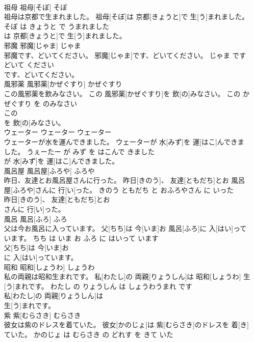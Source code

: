 \documentclass[8pt]{extreport}
\begin{document}
\begin{CJK}{UTF8}{min}
\\	祖母	祖母[そぼ]	そぼ	
\\	祖母は京都で生まれました。	祖母[そぼ]は 京都[きょうと]で 生[う]まれました。	そぼ は きょうと で うまれました	
\\	は 京都[きょうと]で 生[う]まれました。			
\\	邪魔	邪魔[じゃま]	じゃま	
\\	邪魔です、どいてください。	邪魔[じゃま]です、どいてください。	じゃま です どいて ください	
\\	です、どいてください。			
\\	風邪薬	風邪薬[かぜぐすり]	かぜぐすり	
\\	この風邪薬を飲みなさい。	この 風邪薬[かぜぐすり]を 飲[の]みなさい。	この かぜぐすり を のみなさい	
\\	この
\\	を 飲[の]みなさい。			
\\	ウェーター	ウェーター	ウェーター	
\\	ウェーターが水を運んできました。	ウェーターが 水[みず]を 運[はこ]んできました。	うぇーたー が みず を はこんで きました	
\\	が 水[みず]を 運[はこ]んできました。			
\\	風呂屋	風呂屋[ふろや]	ふろや	
\\	昨日、友達とお風呂屋さんに行った。	昨日[きのう]、 友達[ともだち]とお 風呂屋[ふろや]さんに 行[い]った。	きのう ともだち と おふろやさん に いった	
\\	昨日[きのう]、 友達[ともだち]とお
\\	さんに 行[い]った。			
\\	風呂	風呂[ふろ]	ふろ	
\\	父は今お風呂に入っています。	父[ちち]は 今[いま]お 風呂[ふろ]に 入[はい]っています。	ちち は いま お ふろ に はいって います	
\\	父[ちち]は 今[いま]お
\\	に 入[はい]っています。			
\\	昭和	昭和[しょうわ]	しょうわ	
\\	私の両親は昭和生まれです。	私[わたし]の 両親[りょうしん]は 昭和[しょうわ] 生[う]まれです。	わたし の りょうしん は しょうわうまれ です	
\\	私[わたし]の 両親[りょうしん]は
\\	生[う]まれです。			
\\	紫	紫[むらさき]	むらさき	
\\	彼女は紫のドレスを着ていた。	彼女[かのじょ]は 紫[むらさき]のドレスを 着[き]ていた。	かのじょ は むらさき の どれす を きて いた	

\end{CJK}
\end{document}
